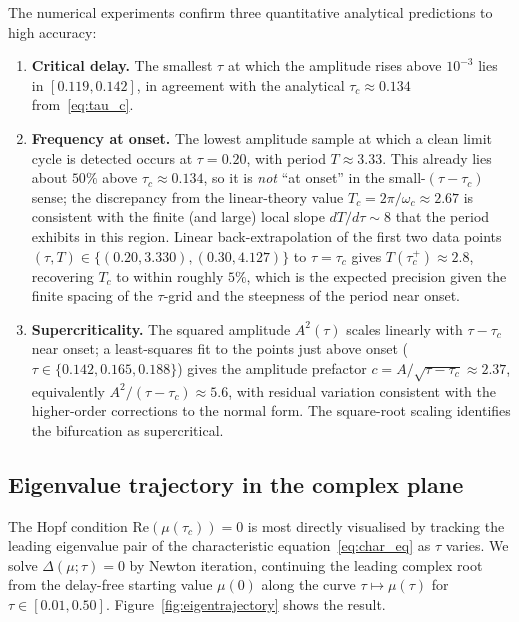 \documentclass[sn-mathphys,Numbered]{sn-jnl}
\theoremstyle{thmstyleone}
\theoremstyle{thmstyletwo}
\theoremstyle{thmstylethree}
\begin{document}
The numerical experiments confirm three quantitative analytical predictions
to high accuracy:
\begin{enumerate}
  \item \textbf{Critical delay.} The smallest $\tau$ at which the
        amplitude rises above $10^{-3}$ lies in $[0.119,0.142]$, in
        agreement with the analytical $\tau_c\approx 0.134$
        from~\eqref{eq:tau_c}.
  \item \textbf{Frequency at onset.} The lowest amplitude sample at
        which a clean limit cycle is detected occurs at $\tau=0.20$, with
        period $T\approx 3.33$. This already lies about $50\%$ above
        $\tau_c\approx 0.134$, so it is \emph{not} ``at onset'' in the
        small-$(\tau-\tau_c)$ sense; the discrepancy from the
        linear-theory value $T_c=2\pi/\omega_c\approx 2.67$ is consistent
        with the finite (and large) local slope $dT/d\tau\sim 8$ that the
        period exhibits in this region. Linear back-extrapolation of the
        first two data points $(\tau,T)\in\{(0.20,3.330),(0.30,4.127)\}$ to
        $\tau=\tau_c$ gives $T(\tau_c^+)\approx 2.8$, recovering $T_c$ to
        within roughly $5\%$, which is the expected precision given the
        finite spacing of the $\tau$-grid and the steepness of the period
        near onset.
  \item \textbf{Supercriticality.} The squared amplitude $A^2(\tau)$
        scales linearly with $\tau-\tau_c$ near onset; a least-squares
        fit to the points just above onset
        ($\tau\in\{0.142,0.165,0.188\}$) gives the amplitude prefactor
        $c=A/\sqrt{\tau-\tau_c}\approx 2.37$, equivalently
        $A^2/(\tau-\tau_c)\approx 5.6$, with residual variation
        consistent with the higher-order corrections to the normal form.
        The square-root scaling identifies the bifurcation as
        supercritical.
\end{enumerate}

\subsection{Eigenvalue trajectory in the complex plane}
\label{sec:eigtraj}

The Hopf condition $\mathrm{Re}(\mu(\tau_c))=0$ is most directly
visualised by tracking the leading eigenvalue pair of the characteristic
equation~\eqref{eq:char_eq} as $\tau$ varies. We solve $\Delta(\mu;\tau)=0$
by Newton iteration, continuing the leading complex root from the
delay-free starting value $\mu(0)$ along the curve
$\tau\mapsto\mu(\tau)$ for $\tau\in[0.01,0.50]$.
Figure~\ref{fig:eigentrajectory} shows the result.
\end{document}
